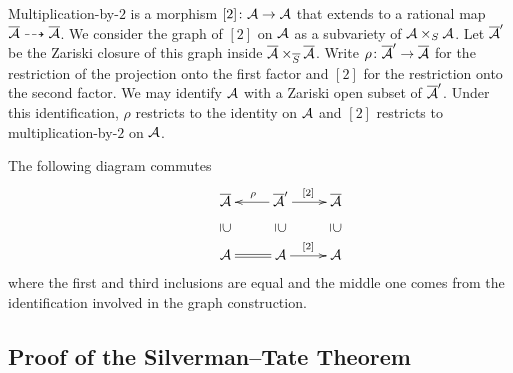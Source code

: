 



Multiplication-by-$2$ is a morphism $[2]\colon \mathcal{A}\rightarrow \mathcal{A}$
that extends to a rational map
$\overline{\mathcal{A}}\dashrightarrow\overline{\mathcal{A}}$.
We consider the graph of $[2]$ on $\mathcal{A}$ as a subvariety of
$\mathcal{A}\times_S\mathcal{A}$.
Let $\overline{\mathcal{A}}'$ be the Zariski closure of this graph inside
$\overline{\mathcal{A}}\times_{\overline S}\overline{\mathcal{A}}$. 
 Write $\rho\colon
\overline{\mathcal{A}}'\rightarrow\overline{\mathcal{A}}$ for the restriction of the projection onto the
first factor and  $[2]$ for the restriction onto the second factor.
We may identify $\mathcal{A}$ with a Zariski open subset of
$\overline{\mathcal{A}}'$. Under this identification, $\rho$ restricts to the
identity on $\mathcal{A}$ and $[2]$ restricts to multiplication-by-$2$ on
$\mathcal{A}$. 

The following diagram  commutes
\begin{equation*}
  \xymatrix{
 & \overline{\cA} \ar@{}[d]|-*[@]{\supset}      &\ar[l]_\rho \overline{\cA}' \ar@{}[d]|-*[@]{\supset}   \ar[r]^{[2]} & \overline{\cA}\ar@{}[d]|-*[@]{\supset} \\
& \cA \ar@{=}[r]  & {\cA}      \ar[r]^{[2]} &{\cA} 
  }  
\end{equation*}
where the first and third inclusions are equal and the middle one
comes from the identification involved in the graph construction. 



\subsection{Proof of the Silverman--Tate Theorem}


